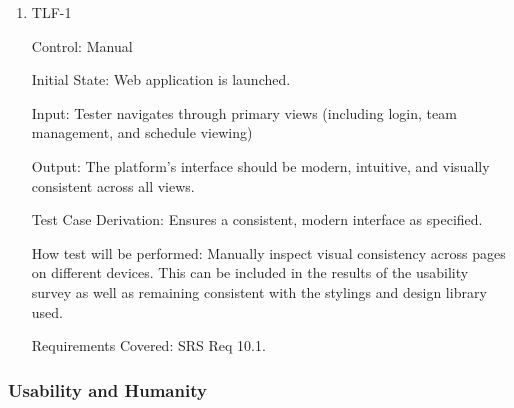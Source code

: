 \documentclass[12pt, titlepage]{article}
\begin{document}
\begin{enumerate}

\item{TLF-1\\}

Control: Manual
					
Initial State: Web application is launched.
					
Input: Tester navigates through primary views (including login, team management, and schedule viewing)
					
Output: The platform’s interface should be modern, intuitive, and visually consistent across all views.

Test Case Derivation: Ensures a consistent, modern interface as specified.
					
How test will be performed: Manually inspect visual consistency across pages on different devices. This can be included in the results of the usability survey as well as remaining consistent with the stylings and design library used.

Requirements Covered: SRS Req 10.1.

\end{enumerate}

\subsubsection{Usability and Humanity}
\end{document}
